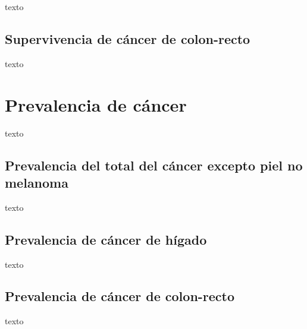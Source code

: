 texto

\subsection{Supervivencia de cáncer de colon-recto}

texto

\section{Prevalencia de cáncer}

texto

\subsection{Prevalencia del total del cáncer excepto piel no melanoma}

texto

\subsection{Prevalencia de cáncer de hígado}

texto

\subsection{Prevalencia de cáncer de colon-recto}

texto






